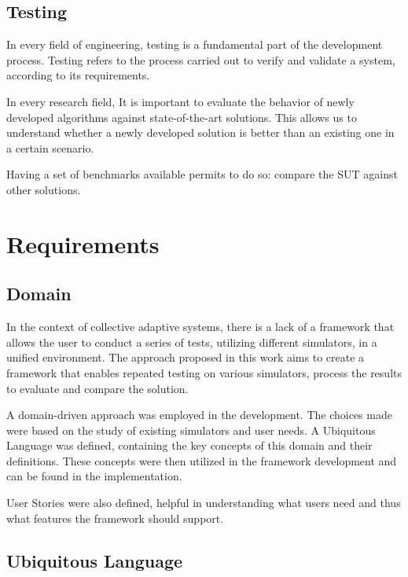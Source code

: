 \documentclass[12pt,a4paper,openright,twoside]{book}
\begin{document}
\section{Testing}

In every field of engineering, testing is a fundamental part of the development process.
Testing refers to the process carried out to verify and validate a system, according to its requirements. \cite{Spillner2011}

In every research field, It is important to evaluate the behavior of newly developed algorithms against state-of-the-art solutions.
This allows us to understand whether a newly developed solution is better than an existing one in a certain scenario.

Having a set of benchmarks available permits to do so: compare the \ac{SUT} against other solutions.

\chapter{Requirements}

\section*{Domain}

In the context of collective adaptive systems, there is a lack of a framework that allows the user to conduct a series of tests, utilizing different simulators, in a unified environment. 
The approach proposed in this work aims to create a framework that enables repeated testing on various simulators, process the results to evaluate and compare the solution.

A domain-driven approach was employed in the development. The choices made were based on the study of existing simulators and user needs. A Ubiquitous Language was defined, containing the key concepts of this domain and their definitions. 
These concepts were then utilized in the framework development and can be found in the implementation.

User Stories were also defined, helpful in understanding what users need and thus what features the framework should support.

\section{Ubiquitous Language}
\end{document}
